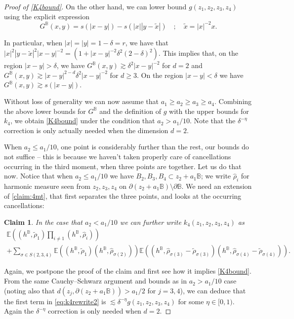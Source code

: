 \documentclass[10pt]{amsart}
\newtheorem{claim}[theorem]{Claim}
\theoremstyle{definition}
\newcommand{\E}{\mathbb{E}}
\newcommand{\B}{\mathbb{B}}\let\D\B\let\Ub\B
\begin{document}
\begin{proof}[Proof of \eqref{K4bound}]
On the other hand, we can lower bound $g(z_1,z_2,z_3,z_4)$ using the explicit expression
\[
G^\B(x,y)=s(|x-y|)-s(|x||y-\tilde{x}|) \quad ; \quad \tilde{x}=|x|^{-2}x.
\]

In particular, when $|x|=|y|=1-\delta=r$, we have that $|x|^2|y-\tilde{x}|^2|x-y|^{-2}=(1+|x-y|^{-2}\delta^2(2-\delta)^2)$. This implies that, on the region $|x-y|>\delta$, we have $ G^\B(x,y)\gtrsim \delta^2|x-y|^{-2}$ for $d=2$ and $G^\B(x,y) \gtrsim |x-y|^{2-d}\delta^2|x-y|^{-2}$ for $d\ge 3$. On the region $|x-y|<\delta$ we have $G^\B(x,y)\gtrsim s(|x-y|)$.

Without loss of generality we can now assume that $a_1\ge a_2\ge a_3\ge a_4$.
Combining the above lower bounds for $G^\B$ and the definition of $g$ with the upper bounds for $k_4$, we obtain \eqref{K4bound} under the condition that $a_2>a_1/10$. Note that the $\delta^{-\eta}$ correction is only actually needed when the dimension $d=2$.

When $a_2 \leq a_1/10$, \ie one point is considerably further than the rest, our bounds do not suffice -- this is because we haven't taken properly care of cancellations occurring in the {third moment, when three points are together}. Let us do that now.
Notice that when $a_2 \leq a_1/10$ we have $B_2,B_3,B_4\subset z_2+a_1\B$; we write $\hat\rho_i$ for harmonic measure seen from $z_2,z_3,z_4$ on $\partial(z_2+a_1\B)\setminus \partial\B$. We need an extension of \cref{claim:4mt}, that first separates the three points, and looks at the occurring cancellations:

\begin{claim}
In the case that $a_2<a_1/10$ we can further write $k_4(z_1,z_2,z_3,z_4)$ as\vspace*{-3pt}
\begin{multline}\label{eq:k4rewrite2}\E((h^\B,\tilde{\rho}_1)\prod_{i\ne 1} (h^\B,\hat\rho_i))\\[-3pt]
+\sum_{\sigma\in S({2,3,4})} \E((h^\B,\tilde{\rho}_1)(h^\B,\hat\rho_{\sigma(2)}))\E((h^\B,\hat\rho_{\sigma(3)}-\tilde{\rho}_{\sigma(3)})(h^\B,\hat\rho_{\sigma(4)}-\tilde{\rho}_{\sigma(4)})).\end{multline}
\end{claim}

Again, we postpone the proof of the claim and first see how it implies \eqref{K4bound}.
From the same Cauchy--Schwarz argument and bounds as in $a_2>a_1/10$ case (noting also that $d(z_j,\partial (z_2+a_1\B))>a_1/2$ for $j=3,4$), we can deduce that the first term in \eqref{eq:k4rewrite2} is $\lesssim \delta^{-\eta} g(z_1,z_2,z_3,z_4)$ for some $\eta\in [0,1)$. Again the $\delta^{-\eta}$ correction is only needed when $d=2$.


\end{proof}
\end{document}
